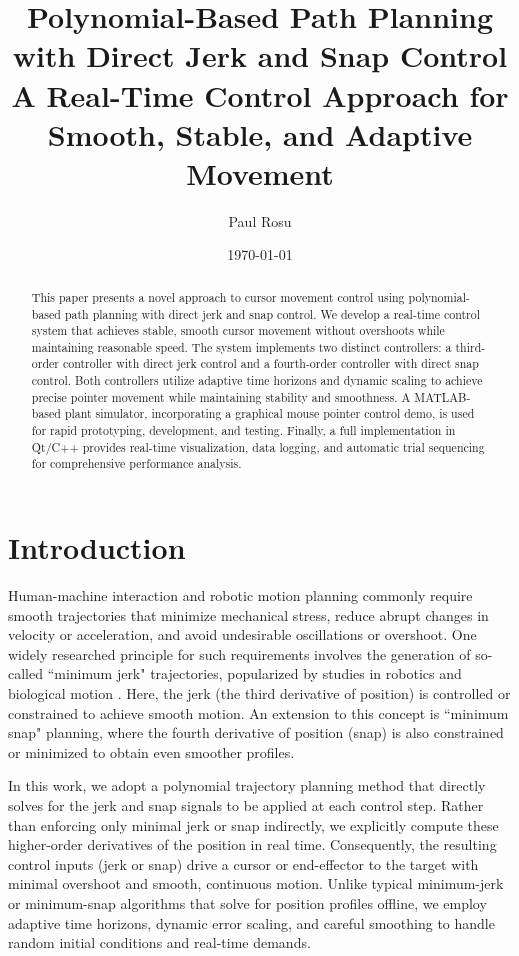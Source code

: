 \documentclass[12pt]{article}
\title{Polynomial-Based Path Planning with Direct Jerk and Snap Control \\ \large A Real-Time Control Approach for Smooth, Stable, and Adaptive Movement}
\author{Paul Rosu}
\date{\today}
\begin{document}
\maketitle

\begin{abstract}
This paper presents a novel approach to cursor movement control using polynomial-based path planning with direct jerk and snap control. We develop a real-time control system that achieves stable, smooth cursor movement without overshoots while maintaining reasonable speed. The system implements two distinct controllers: a third-order controller with direct jerk control and a fourth-order controller with direct snap control. Both controllers utilize adaptive time horizons and dynamic scaling to achieve precise pointer movement while maintaining stability and smoothness. A MATLAB-based plant simulator, incorporating a graphical mouse pointer control demo, is used for rapid prototyping, development, and testing. Finally, a full implementation in Qt/C++ provides real-time visualization, data logging, and automatic trial sequencing for comprehensive performance analysis.
\end{abstract}

\section{Introduction}
Human-machine interaction and robotic motion planning commonly require smooth trajectories that minimize mechanical stress, reduce abrupt changes in velocity or acceleration, and avoid undesirable oscillations or overshoot. One widely researched principle for such requirements involves the generation of so-called ``minimum jerk" trajectories, popularized by studies in robotics and biological motion \cite{KyriakopoulosSaridis1988}. Here, the jerk (the third derivative of position) is controlled or constrained to achieve smooth motion. An extension to this concept is ``minimum snap" planning, where the fourth derivative of position (snap) is also constrained or minimized to obtain even smoother profiles.

In this work, we adopt a polynomial trajectory planning method that directly solves for the jerk and snap signals to be applied at each control step. Rather than enforcing only minimal jerk or snap indirectly, we explicitly compute these higher-order derivatives of the position in real time. Consequently, the resulting control inputs (jerk or snap) drive a cursor or end-effector to the target with minimal overshoot and smooth, continuous motion. Unlike typical minimum-jerk or minimum-snap algorithms that solve for position profiles offline, we employ adaptive time horizons, dynamic error scaling, and careful smoothing to handle random initial conditions and real-time demands.
\end{document}
